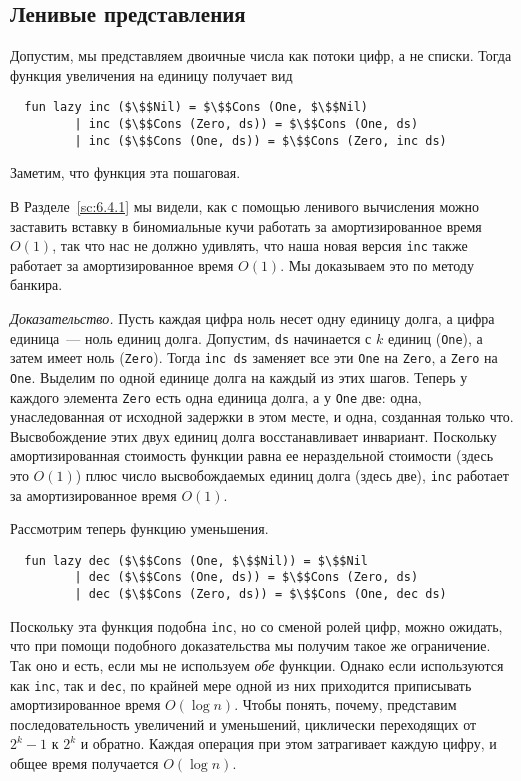 \begin{frame}[fragile]{}

\subsection{Ленивые представления}
\label{sc:9.2.3}

Допустим, мы представляем двоичные числа как потоки цифр, а не
списки. Тогда функция увеличения на единицу получает вид
\begin{lstlisting}
  fun lazy inc ($\$$Nil) = $\$$Cons (One, $\$$Nil)
         | inc ($\$$Cons (Zero, ds)) = $\$$Cons (One, ds)
         | inc ($\$$Cons (One, ds)) = $\$$Cons (Zero, inc ds)
\end{lstlisting}
Заметим, что функция эта пошаговая.

В Разделе~\ref{sc:6.4.1} мы видели, как с помощью ленивого вычисления
можно заставить вставку в биномиальные кучи работать за
амортизированное время $O(1)$, так что нас не должно удивлять, что
наша новая версия \lstinline!inc! также работает за амортизированное
время $O(1)$. Мы доказываем это по методу банкира.

\emph{Доказательство.} Пусть каждая цифра ноль несет одну единицу долга, а
цифра единица~--- ноль единиц долга. Допустим, \lstinline!ds!
начинается с $k$ единиц (\lstinline!One!), а затем имеет ноль
(\lstinline!Zero!). Тогда \lstinline!inc ds! заменяет все эти \lstinline!One!
на \lstinline!Zero!, а \lstinline!Zero! на \lstinline!One!.
Выделим по одной единице долга на каждый
из этих шагов. Теперь у каждого элемента \lstinline!Zero! есть одна
единица долга, а у \lstinline!One! две: одна, унаследованная от
исходной задержки в этом месте, и одна, созданная только
что. Высвобождение этих двух единиц долга восстанавливает
инвариант. Поскольку амортизированная стоимость функции равна ее
нераздельной стоимости (здесь это $O(1)$) плюс число высвобождаемых
единиц долга (здесь две), \lstinline!inc! работает за амортизированное
время $O(1)$.

Рассмотрим теперь функцию уменьшения.
\begin{lstlisting}
  fun lazy dec ($\$$Cons (One, $\$$Nil)) = $\$$Nil
         | dec ($\$$Cons (One, ds)) = $\$$Cons (Zero, ds)
         | dec ($\$$Cons (Zero, ds)) = $\$$Cons (One, dec ds)
\end{lstlisting}
Поскольку эта функция подобна \lstinline!inc!, но
со сменой ролей цифр, можно ожидать, что при помощи подобного
доказательства мы получим такое же ограничение. Так оно и есть, если
мы не используем \emph{обе} функции. Однако если используются как
\lstinline!inc!, так и \lstinline!dec!, по крайней мере одной из них
приходится приписывать амортизированное время $O(\log n)$. Чтобы понять,
почему, представим последовательность увеличений и уменьшений,
циклически переходящих от $2^k - 1$ к $2^k$ и обратно. Каждая операция
при этом затрагивает каждую цифру, и общее время получается $O(\log
n)$.


\end{frame}
